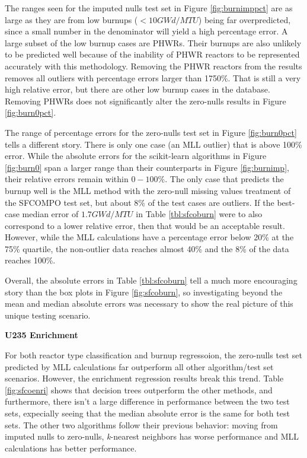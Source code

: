 The ranges seen for the imputed nulls test set in Figure \ref{fig:burnimppct}
are as large as they are from low burnups ($< 10 GWd/MTU$) being far
overpredicted, since a small number in the denominator will yield a high
percentage error. A large subset of the low burnup cases are \gls{PHWR}s.
Their burnups are also unlikely to be predicted well because of the inability
of \gls{PHWR} reactors to be represented accurately with this methodology.
Removing the \gls{PHWR} reactors from the results removes all outliers with
percentage errors larger than 1750\%. That is still a very high relative error,
but there are other low burnup cases in the database.  Removing \gls{PHWR}s
does not significantly alter the zero-nulls results in Figure
\ref{fig:burn0pct}.

The range of percentage errors for the zero-nulls test set in Figure
\ref{fig:burn0pct} tells a different story. There is only one case (an
\gls{MLL} outlier) that is above 100\% error.  While the absolute errors for
the scikit-learn algorithms in Figure \ref{fig:burn0} span a larger range than
their counterparts in Figure \ref{fig:burnimp}, their relative errors remain
within $0-100\%$. The only case that predicts the burnup well is the \gls{MLL}
method with the zero-null missing values treatment of the \gls{SFCOMPO} test
set, but about 8\% of the test cases are outliers.  If the best-case median
error of $1.7 GWd/MTU$ in Table \ref{tbl:sfcoburn} were to also correspond to a
lower relative error, then that would be an acceptable result.  However, while
the \gls{MLL} calculations have a percentage error below 20\% at the 75\%
quartile, the non-outlier data reaches almost 40\% and the 8\% of the data
reaches 100\%.

Overall, the absolute errors in Table \ref{tbl:sfcoburn} tell a much more
encouraging story than the box plots in Figure \ref{fig:sfcoburn}, so
investigating beyond the mean and median absolute errors was necessary to show
the real picture of this unique testing scenario. 

\noindent \textbf{\gls{U235} Enrichment}

For both reactor type classification and burnup regressoion, the zero-nulls
test set predicted by \gls{MLL} calculations far outperform all other
algorithm/test set scenarios. However, the enrichment regression results break
this trend.  Table \ref{fig:sfcoenri} shows that decision trees outperform the
other methods, and furthermore, there isn't a large difference in performance
between the two test sets, expecially seeing that the median absolute error is
the same for both test sets.  The other two algorithms follow their previous
behavior: moving from imputed nulls to zero-nulls, \textit{k}-nearest neighbors
has worse performance and \gls{MLL} calculations has better performance.

